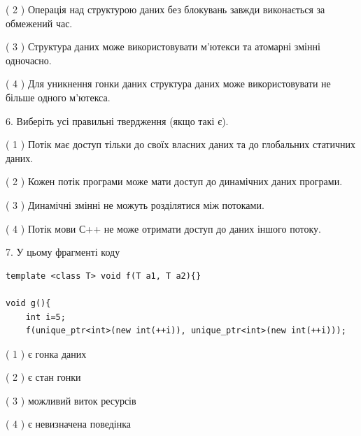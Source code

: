 \documentclass[12pt, ukrainian]{article}
\begin{document}
\begin {large}
{( 2 ) Операція над структурою даних без блокувань завжди виконається за обмежений час.%

( 3 ) Структура даних може використовувати м’ютекси та атомарні змінні одночасно.%

( 4 ) Для уникнення гонки даних структура даних може використовувати не більше одного м’ютекса.%
\newpage



\vspace{5mm}
6. Виберіть усі правильні твердження (якщо такі є).\par
\vspace{2mm}

( 1 ) Потік має доступ тільки до своїх власних даних та до глобальних статичних даних.%

( 2 ) Кожен потік програми може мати доступ до динамічних даних програми.%

( 3 ) Динамічні змінні не можуть розділятися між потоками.%

( 4 ) Потік мови С++ не може отримати доступ до даних іншого потоку.%


\vspace{5mm}
7. У цьому фрагменті коду
\begin{verbatim}
template <class T> void f(T a1, T a2){}

void g(){
    int i=5;
    f(unique_ptr<int>(new int(++i)), unique_ptr<int>(new int(++i)));
\end{verbatim}

( 1 ) є гонка даних%

( 2 ) є стан гонки%

( 3 ) можливий виток ресурсів%

( 4 ) є невизначена поведінка%
}
\end {large}
\end{document}
